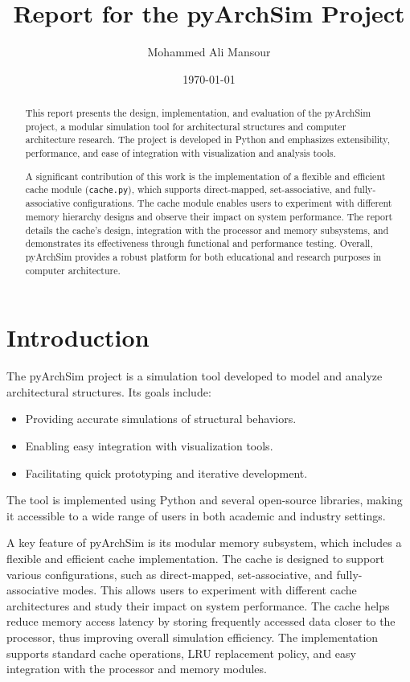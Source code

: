 \documentclass[12pt,a4paper]{report}
\title{Report for the pyArchSim Project}
\author{Mohammed Ali Mansour}
\date{\today}
\begin{document}
\maketitle
\tableofcontents
\newpage

\begin{abstract}
This report presents the design, implementation, and evaluation of the pyArchSim project, a modular simulation tool for architectural structures and computer architecture research. The project is developed in Python and emphasizes extensibility, performance, and ease of integration with visualization and analysis tools. 

A significant contribution of this work is the implementation of a flexible and efficient cache module (\texttt{cache.py}), which supports direct-mapped, set-associative, and fully-associative configurations. The cache module enables users to experiment with different memory hierarchy designs and observe their impact on system performance. The report details the cache's design, integration with the processor and memory subsystems, and demonstrates its effectiveness through functional and performance testing. Overall, pyArchSim provides a robust platform for both educational and research purposes in computer architecture.
\end{abstract}

\renewcommand{\thesection}{\arabic{section}}
\renewcommand{\thesubsection}{\thesection.\arabic{subsection}}

\section{Introduction}
The pyArchSim project\cite{pyarchsim_hawajkm} is a simulation tool developed to model and analyze architectural structures. Its goals include:
\begin{itemize}
  \item Providing accurate simulations of structural behaviors.
  \item Enabling easy integration with visualization tools.
  \item Facilitating quick prototyping and iterative development.
\end{itemize}

The tool\cite{pyarchsim_hawajkm} is implemented using Python and several open-source libraries, making it accessible to a wide range of users in both academic and industry settings.

A key feature of pyArchSim is its modular memory subsystem\cite{pyarchsim_mohammed}, which includes a flexible and efficient cache implementation. The cache is designed to support various configurations, such as direct-mapped, set-associative, and fully-associative modes\cite{cache_adeorha,sciencedirect_set_associative}. This allows users to experiment with different cache architectures and study their impact on system performance. The cache helps reduce memory access latency by storing frequently accessed data closer to the processor, thus improving overall simulation efficiency. The implementation supports standard cache operations, LRU replacement policy\cite{gfg_lru_cache}, and easy integration with the processor and memory modules.
\end{document}
